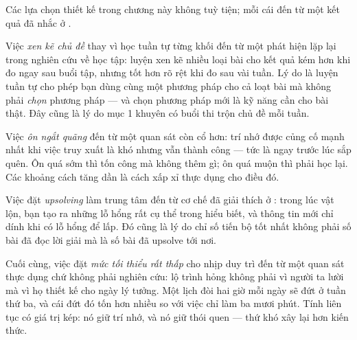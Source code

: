 \documentclass[../../algorithm.tex]{subfiles}
\begin{document}
Các lựa chọn thiết kế trong chương này không tuỳ tiện; mỗi cái đến từ một kết quả đã nhắc ở .

Việc \emph{xen kẽ chủ đề} thay vì học tuần tự từng khối đến từ một phát hiện lặp lại trong nghiên cứu về học tập: luyện xen kẽ nhiều loại bài cho kết quả kém hơn khi đo ngay sau buổi tập, nhưng tốt hơn rõ rệt khi đo sau vài tuần. Lý do là luyện tuần tự cho phép bạn dùng cùng một phương pháp cho cả loạt bài mà không phải \emph{chọn} phương pháp --- và chọn phương pháp mới là kỹ năng cần cho bài thật. Đây cũng là lý do mục 1 khuyên có buổi thi trộn chủ đề mỗi tuần.

Việc \emph{ôn ngắt quãng} đến từ một quan sát còn cổ hơn: trí nhớ được củng cố mạnh nhất khi việc truy xuất là khó nhưng vẫn thành công --- tức là ngay trước lúc sắp quên. Ôn quá sớm thì tốn công mà không thêm gì; ôn quá muộn thì phải học lại. Các khoảng cách tăng dần là cách xấp xỉ thực dụng cho điều đó.

Việc đặt \emph{upsolving} làm trung tâm đến từ cơ chế đã giải thích ở : trong lúc vật lộn, bạn tạo ra những lỗ hổng rất cụ thể trong hiểu biết, và thông tin mới chỉ dính khi có lỗ hổng để lấp. Đó cũng là lý do chỉ số tiến bộ tốt nhất không phải số bài đã đọc lời giải mà là số bài đã upsolve tới nơi.

Cuối cùng, việc đặt \emph{mức tối thiểu rất thấp} cho nhịp duy trì đến từ một quan sát thực dụng chứ không phải nghiên cứu: lộ trình hỏng không phải vì người ta lười mà vì họ thiết kế cho ngày lý tưởng. Một lịch đòi hai giờ mỗi ngày sẽ đứt ở tuần thứ ba, và cái đứt đó tốn hơn nhiều so với việc chỉ làm ba mươi phút. Tính liên tục có giá trị kép: nó giữ trí nhớ, và nó giữ thói quen --- thứ khó xây lại hơn kiến thức.

\begin{gocre}
\end{gocre}
\end{document}
